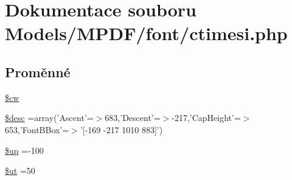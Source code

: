\hypertarget{ctimesi_8php}{\section{Dokumentace souboru Models/\-M\-P\-D\-F/font/ctimesi.php}
\label{ctimesi_8php}
}
\subsection*{Proměnné}
\begin{DoxyCompactItemize}
\item 
\hyperlink{ctimesi_8php_ac2951b03dbb0317e6c61ec920b7479dc}{\$cw}
\item 
\hyperlink{ctimesi_8php_a31059b9e4d0c5af34df20da32232ea9a}{\$desc} =array('Ascent'=$>$683,'Descent'=$>$-\/217,'Cap\-Height'=$>$653,'Font\-B\-Box'=$>$'\mbox{[}-\/169 -\/217 1010 883\mbox{]}')
\item 
\hyperlink{ctimesi_8php_a6b5ad2ac55f9df46e8f34e78fbd6f176}{\$up} =-\/100
\item 
\hyperlink{ctimesi_8php_aadd3f841051043ee58e587e840e8dd0b}{\$ut} =50
\item 

\end{DoxyCompactItemize}
